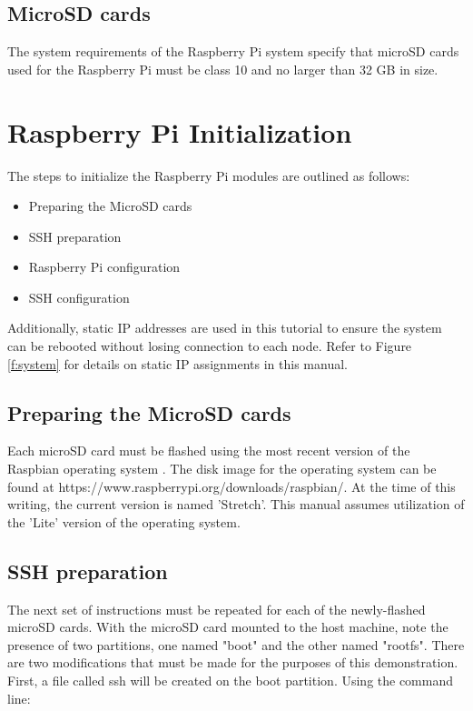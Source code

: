 \documentclass[sigconf]{acmart}
\begin{document}
\subsection{MicroSD cards}

The system requirements of the Raspberry Pi system specify that microSD cards used for the Raspberry Pi must be class 10 and no larger than 32 GB in size.

\section{Raspberry Pi Initialization}

The steps to initialize the Raspberry Pi modules are outlined as follows:

\begin{itemize}
  \setlength{\parskip}{1em}\item Preparing the MicroSD cards
  \setlength{\parskip}{1em}\item SSH preparation
  \setlength{\parskip}{1em}\item Raspberry Pi configuration
  \setlength{\parskip}{1em}\item SSH configuration
\end{itemize}

Additionally, static IP addresses are used in this tutorial to ensure the system can be rebooted without losing connection to each node. Refer to Figure \ref{f:system} for details on static IP assignments in this manual.

\subsection{Preparing the MicroSD cards}

Each microSD card must be flashed using the most recent version of the Raspbian operating system \cite{raspbian2018}. The disk image for the operating system can be found at https://www.raspberrypi.org/downloads/raspbian/. At the time of this writing, the current version is named 'Stretch'. This manual assumes utilization of the 'Lite' version of the operating system.

\subsection{SSH preparation}

The next set of instructions must be repeated for each of the newly-flashed microSD cards. With the microSD card mounted to the host machine, note the presence of two partitions, one named "boot" and the other named "rootfs". There are two modifications that must be made for the purposes of this demonstration. First, a file called ssh will be created on the boot partition. Using the command line:
\end{document}
